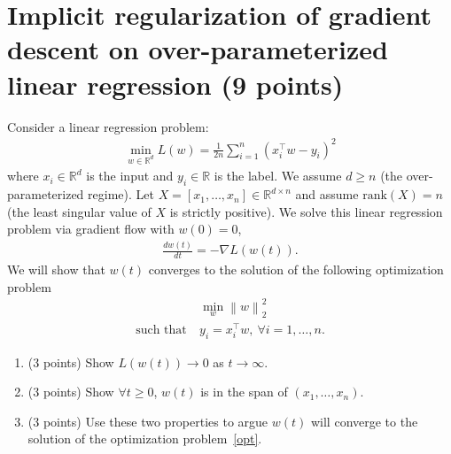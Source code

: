 \documentclass[11pt]{article}
\newcommand{\rank}{\mathrm{rank}}
\newcommand{\norm}[1]{\left\|#1\right\|}
\begin{document}
\section{Implicit regularization of gradient descent on over-parameterized linear regression (9 points)}
Consider a linear regression problem:\begin{align*}
	\min_{w \in \mathbb{R}^d} L(w)=\frac{1}{2n}\sum_{i=1}^n\left(x_i^\top w - y_i\right)^2
\end{align*}
where $x_i \in \mathbb{R}^d$ is the input and $y_i \in \mathbb{R}$ is the label.
We assume $d \ge n$ (the over-parameterized regime).
Let $X = \left[x_1,\ldots,x_n\right] \in \mathbb{R}^{d \times n}$ and assume $\rank\left(X\right)=n$ (the least singular value of $X$ is strictly positive).
We solve this linear regression problem via gradient flow with $w(0) = 0$, \begin{align*}
\frac{dw(t)}{dt} = - \nabla L(w(t)).
\end{align*}
We will show that $w(t)$ converges to the solution of the following optimization problem\begin{align}
	&\min_w \norm{w}_2^2 \nonumber \\
	\text{such that}~&y_i = x_i^\top w,~\forall i=1,\ldots,n. \label{opt}
\end{align}
\begin{enumerate}
	\item (3 points) Show $L(w(t)) \rightarrow 0$ as $t \rightarrow \infty$.
	\item (3 points) Show $\forall t\geq 0$, $w(t)$ is in the span of $(x_1,\ldots,x_n)$.
	\item (3 points) Use these two properties to argue $w(t)$ will converge to the solution of the optimization problem~\eqref{opt}.
\end{enumerate}
\end{document}
